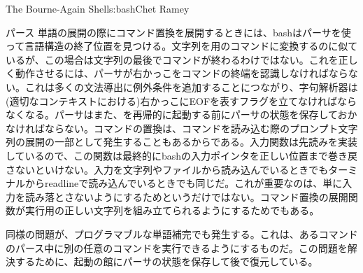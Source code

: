 \begin{aosachapter}{The Bourne-Again Shell}{s:bash}{Chet Ramey}
\begin{aosasect1}{パース}
単語の展開の際にコマンド置換を展開するときには、bashはパーサを使って言語構造の終了位置を見つける。文字列を用のコマンドに変換するのに似ているが、この場合は文字列の最後でコマンドが終わるわけではない。これを正しく動作させるには、パーサが右かっこをコマンドの終端を認識しなければならない。これは多くの文法導出に例外条件を追加することにつながり、字句解析器は(適切なコンテキストにおける)右かっこにEOFを表すフラグを立てなければならなくなる。パーサはまた、を再帰的に起動する前にパーサの状態を保存しておかなければならない。コマンドの置換は、コマンドを読み込む際のプロンプト文字列の展開の一部として発生することもあるからである。入力関数は先読みを実装しているので、この関数は最終的にbashの入力ポインタを正しい位置まで巻き戻さないといけない。入力を文字列やファイルから読み込んでいるときでもターミナルからreadlineで読み込んでいるときでも同じだ。これが重要なのは、単に入力を読み落とさないようにするためというだけではない。コマンド置換の展開関数が実行用の正しい文字列を組み立てられるようにするためでもある。

同様の問題が、プログラマブルな単語補完でも発生する。これは、あるコマンドのパース中に別の任意のコマンドを実行できるようにするものだ。この問題を解決するために、起動の館にパーサの状態を保存して後で復元している。


\end{aosasect1}
\end{aosachapter}
